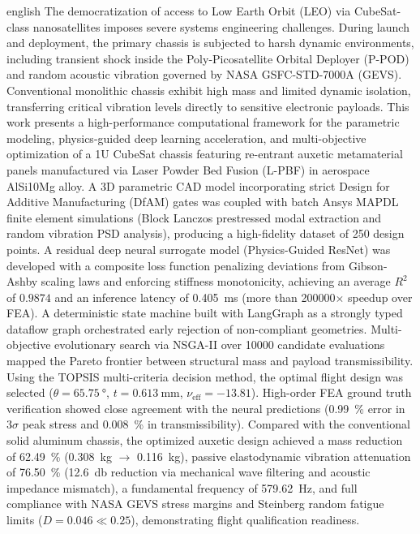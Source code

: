 \begin{resumo}[Abstract]
\begin{otherlanguage*}{english}
The democratization of access to Low Earth Orbit (LEO) via CubeSat-class nanosatellites imposes severe systems engineering challenges. During launch and deployment, the primary chassis is subjected to harsh dynamic environments, including transient shock inside the Poly-Picosatellite Orbital Deployer (P-POD) and random acoustic vibration governed by NASA GSFC-STD-7000A (GEVS). Conventional monolithic chassis exhibit high mass and limited dynamic isolation, transferring critical vibration levels directly to sensitive electronic payloads. This work presents a high-performance computational framework for the parametric modeling, physics-guided deep learning acceleration, and multi-objective optimization of a 1U CubeSat chassis featuring re-entrant auxetic metamaterial panels manufactured via Laser Powder Bed Fusion (L-PBF) in aerospace AlSi10Mg alloy. A 3D parametric CAD model incorporating strict Design for Additive Manufacturing (DfAM) gates was coupled with batch Ansys MAPDL finite element simulations (Block Lanczos prestressed modal extraction and random vibration PSD analysis), producing a high-fidelity dataset of 250 design points. A residual deep neural surrogate model (Physics-Guided ResNet) was developed with a composite loss function penalizing deviations from Gibson-Ashby scaling laws and enforcing stiffness monotonicity, achieving an average $R^2$ of $0.9874$ and an inference latency of \SI[output-decimal-marker={.}]{0.405}{\milli\second} (more than \num[group-separator={,}]{200000}$\times$ speedup over FEA). A deterministic state machine built with LangGraph as a strongly typed dataflow graph orchestrated early rejection of non-compliant geometries. Multi-objective evolutionary search via NSGA-II over \num[group-separator={,}]{10000} candidate evaluations mapped the Pareto frontier between structural mass and payload transmissibility. Using the TOPSIS multi-criteria decision method, the optimal flight design was selected ($\theta = \SI[output-decimal-marker={.}]{65.75}{\degree}$, $t = \SI[output-decimal-marker={.}]{0.613}{\milli\metre}$, $\nu_{\text{eff}} = -13.81$). High-order FEA ground truth verification showed close agreement with the neural predictions (\SI[output-decimal-marker={.}]{0.99}{\percent} error in $3\sigma$ peak stress and \SI[output-decimal-marker={.}]{0.008}{\percent} in transmissibility). Compared with the conventional solid aluminum chassis, the optimized auxetic design achieved a mass reduction of \SI[output-decimal-marker={.}]{62.49}{\percent} (\SI[output-decimal-marker={.}]{0.308}{\kilo\gram} $\to$ \SI[output-decimal-marker={.}]{0.116}{\kilo\gram}), passive elastodynamic vibration attenuation of \SI[output-decimal-marker={.}]{76.50}{\percent} (\SI[output-decimal-marker={.}]{12.6}{\decibel} reduction via mechanical wave filtering and acoustic impedance mismatch), a fundamental frequency of \SI[output-decimal-marker={.}]{579.62}{\hertz}, and full compliance with NASA GEVS stress margins and Steinberg random fatigue limits ($D = 0.046 \ll 0.25$), demonstrating flight qualification readiness.


\end{otherlanguage*}
\end{resumo}
